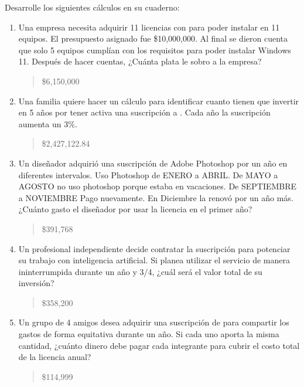 \documentclass[letterpaper,10pt,spanish]{sphinxmanual}
\begin{document}
\sphinxAtStartPar
Desarrolle los siguientes cálculos en su cuaderno:
\begin{enumerate}
%
\item {} 
\sphinxAtStartPar
Una empresa necesita adquirir 11 licencias con  para poder instalar en 11 equipos. El presupuesto asignado fue \$10,000,000. Al final se dieron cuenta que solo 5 equipos cumplían con los requisitos para poder instalar Windows 11. Después de hacer cuentas, ¿Cuánta plata le sobro a la empresa?
\begin{quote}

\sphinxAtStartPar
{} \$6,150,000
\end{quote}

\item {} 
\sphinxAtStartPar
Una familia quiere hacer un cálculo para identificar cuanto tienen que invertir en 5 años por tener activa una suscripción a . Cada año la suscripción aumenta un 3\%.
\begin{quote}

\sphinxAtStartPar
{} \$2,427,122.84
\end{quote}

\item {} 
\sphinxAtStartPar
Un diseñador adquirió una suscripción de Adobe Photoshop por un año en diferentes intervalos. Uso Photoshop de ENERO a ABRIL. De MAYO a AGOSTO no uso photoshop porque estaba en vacaciones. De SEPTIEMBRE a NOVIEMBRE Pago nuevamente. En Diciembre la renovó por un año más. ¿Cuánto gasto el diseñador por usar la licencia en el primer año?
\begin{quote}

\sphinxAtStartPar
{} \$391,768
\end{quote}

\item {} 
\sphinxAtStartPar
Un profesional independiente decide contratar la suscripción  para potenciar su trabajo con inteligencia artificial. Si planea utilizar el servicio de manera ininterrumpida durante un año y 3/4, ¿cuál será el valor total de su inversión?
\begin{quote}

\sphinxAtStartPar
{} \$358,200
\end{quote}

\item {} 
\sphinxAtStartPar
Un grupo de 4 amigos desea adquirir una suscripción de  para compartir los gastos de forma equitativa durante un año. Si cada uno aporta la misma cantidad, ¿cuánto dinero debe pagar cada integrante para cubrir el costo total de la licencia anual?
\begin{quote}

\sphinxAtStartPar
{} \$114,999
\end{quote}

\end{enumerate}
\end{document}
